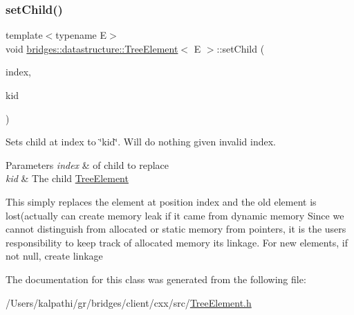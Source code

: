 \subsubsection{\texorpdfstring{set\+Child()}{setChild()}}
{\footnotesize\ttfamily template$<$typename E$>$ \\
void \mbox{\hyperlink{classbridges_1_1datastructure_1_1_tree_element}{bridges\+::datastructure\+::\+Tree\+Element}}$<$ E $>$\+::set\+Child (\begin{DoxyParamCaption}\item[{const size\+\_\+t \&}]{index,  }\item[{\mbox{\hyperlink{classbridges_1_1datastructure_1_1_tree_element}{Tree\+Element}}$<$ E $>$ $\ast$}]{kid }\end{DoxyParamCaption})\hspace{0.3cm}{\ttfamily [inline]}}

Sets child at index to \char`\"{}kid\char`\"{}. Will do nothing given invalid index.


\begin{DoxyParams}{Parameters}
{\em index} & of child to replace \\
\hline
{\em kid} & The child \mbox{\hyperlink{classbridges_1_1datastructure_1_1_tree_element}{Tree\+Element}} \\
\hline
\end{DoxyParams}
This simply replaces the element at position index and the old element is lost(actually can create memory leak if it came from dynamic memory Since we cannot distinguish from allocated or static memory from pointers, it is the user\textquotesingle{}s responsibility to keep track of allocated memory its linkage. For new elements, if not null, create linkage

The documentation for this class was generated from the following file\+:\begin{DoxyCompactItemize}
\item 
/\+Users/kalpathi/gr/bridges/client/cxx/src/\mbox{\hyperlink{_tree_element_8h}{Tree\+Element.\+h}}\end{DoxyCompactItemize}
